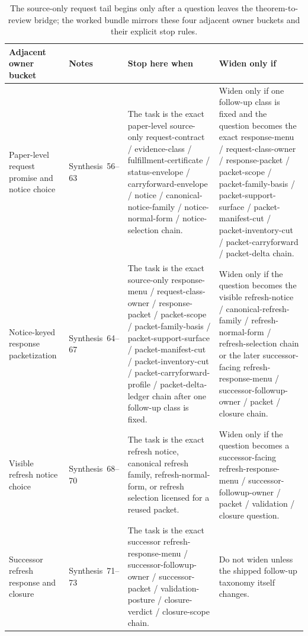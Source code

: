 \documentclass[11pt]{article}
\begin{document}
\begin{table}[t]
\centering
\small
\begin{tabularx}{\linewidth}{@{}l l X X@{}}
\toprule
Adjacent owner bucket & Notes & Stop here when & Widen only if \\
\midrule
Paper-level request promise and notice choice & Synthesis~56--63 & The task is the exact paper-level source-only request-contract / evidence-class / fulfillment-certificate / status-envelope / carryforward-envelope / notice / canonical-notice-family / notice-normal-form / notice-selection chain. & Widen only if one follow-up class is fixed and the question becomes the exact response-menu / request-class-owner / response-packet / packet-scope / packet-family-basis / packet-support-surface / packet-manifest-cut / packet-inventory-cut / packet-carryforward / packet-delta chain. \\
Notice-keyed response packetization & Synthesis~64--67 & The task is the exact source-only response-menu / request-class-owner / response-packet / packet-scope / packet-family-basis / packet-support-surface / packet-manifest-cut / packet-inventory-cut / packet-carryforward-profile / packet-delta-ledger chain after one follow-up class is fixed. & Widen only if the question becomes the visible refresh-notice / canonical-refresh-family / refresh-normal-form / refresh-selection chain or the later successor-facing refresh-response-menu / successor-followup-owner / packet / closure chain. \\
Visible refresh notice choice & Synthesis~68--70 & The task is the exact refresh notice, canonical refresh family, refresh-normal-form, or refresh selection licensed for a reused packet. & Widen only if the question becomes a successor-facing refresh-response-menu / successor-followup-owner / packet / validation / closure question. \\
Successor refresh response and closure & Synthesis~71--73 & The task is the exact successor refresh-response-menu / successor-followup-owner / successor-packet / validation-posture / closure-verdict / closure-scope chain. & Do not widen unless the shipped follow-up taxonomy itself changes. \\
\bottomrule
\end{tabularx}
\caption{The source-only request tail begins only after a question leaves the theorem-to-review bridge; the worked bundle mirrors these four adjacent owner buckets and their explicit stop rules.}
\label{tab:seriesadjacentbuckets}
\end{table}
\end{document}
